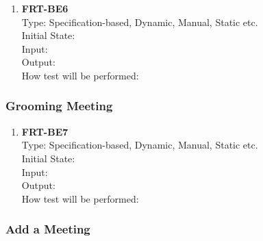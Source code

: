 \documentclass[12pt, titlepage]{article}
\begin{document}
\begin{enumerate}
    \item{\textbf{FRT-BE6}}\\
    Type: Specification-based, Dynamic, Manual, Static etc.\\
    Initial State: \\
    Input: \\
    Output: \\
    How test will be performed: \\
\end{enumerate}

\subsubsection{Grooming Meeting}

\begin{enumerate}
    \item{\textbf{FRT-BE7}}\\
    Type: Specification-based, Dynamic, Manual, Static etc.\\
    Initial State: \\
    Input: \\
    Output: \\
    How test will be performed: \\
\end{enumerate}

\subsubsection{Add a Meeting}
\end{document}
